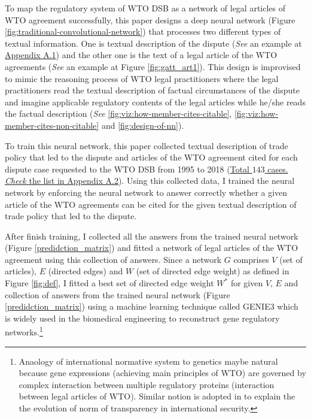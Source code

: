 To map the regulatory system of WTO DSB as 
a network of legal articles of WTO agreement 
successfully,
this paper designs a deep neural network (Figure \ref{fig:traditional-convolutional-network}) that
processes two different types of textual information.
One is textual description of the dispute (\textit{See} an example at \hyperref[sub:factual-aspect-example]{Appendix A.1}) and
the other one is the text of a legal article of the WTO agreements (\textit{See} an example at Figure \ref{fig:gatt_art1}).
This design is improvised to mimic
the reasoning process of WTO legal practitioners
where the legal practitioners read
the textual description of
factual circumstances of the dispute and imagine applicable regulatory contents of
the legal articles while he/she reads the factual description (\textit{See} \ref{fig:viz:how-member-cites-citable}, \ref{fig:viz:how-member-cites-non-citable} and \ref{fig:design-of-nn}).


To train this neural network, this paper collected textual description of trade policy 
that led to the dispute and articles of the WTO agreement cited for each dispute
case requested to the WTO DSB 
from 1995 to 2018 (\hyperref[sub:cited-articles-table]{Total $143$ cases. \textit{Check} the list in Appendix A.2}).
Using this collected data, I trained the neural network by enforcing the neural network to answer correctly 
whether a given article of the WTO agreements
can be cited for the given textual description of 
trade policy that led to the dispute.

After finish training, I collected all the answers from the trained neural network (Figure \ref{predidction_matrix})
and fitted a network of legal articles of the WTO agreement
using this collection of answers.
Since a network $G$ comprises $V$ (set of articles), $E$ (directed edges) and $W$ (set of directed edge weight) as defined in Figure \ref{fig:def}, 
I fitted a best set of directed edge weight $W^*$ for given $V$, $E$ and collection of answers from the trained neural network (Figure \ref{predidction_matrix})
using a machine learning technique called GENIE3 \citep{genie3} 
which is widely used in the biomedical engineering to reconstruct gene regulatory networks.\footnote{Anaology of international normative system to genetics maybe natural because gene expressions (achieving main principles of WTO) are governed by complex interaction between multiple regulatory proteins (interaction between legal articles of WTO). Similar notion is adopted in \cite{gene_analogy} to explain the the evolution of norm of transparency in international security.}

